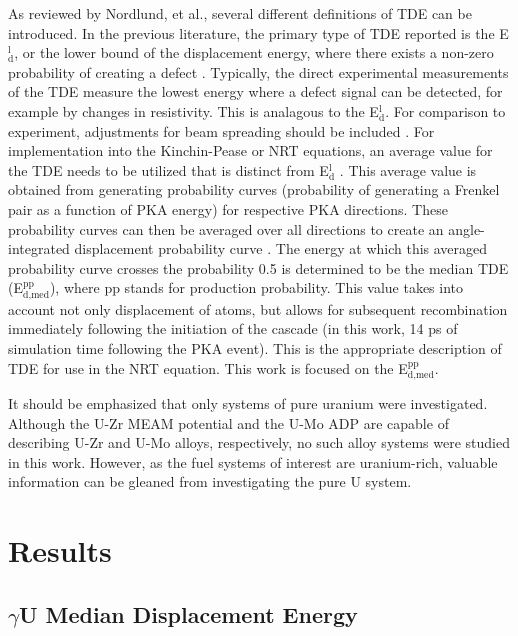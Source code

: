 \documentclass[review]{elsarticle}
\begin{document}
As reviewed by Nordlund, et al.\cite{nordlund2006}, several different definitions of TDE can be introduced. In the previous literature, the primary type of TDE reported is the E$^{\textrm{l}}_{\textrm{d}}$, or the lower bound of the displacement energy, where there exists a non-zero probability of creating a defect \cite{malerba2002}. Typically, the direct experimental measurements of the TDE measure the lowest energy where a defect signal can be detected, for example by changes in resistivity. This is analagous to the E$^{\textrm{l}}_{\textrm{d}}$. For comparison to experiment, adjustments for beam spreading should be included \cite{nordlund2006}. For implementation into the Kinchin-Pease or NRT equations, an average value for the TDE needs to be utilized that is distinct from E$^{\textrm{l}}_{\textrm{d}}$ \cite{nordlund2006,norgett1975}. This average value is obtained from generating probability curves (probability of generating a Frenkel pair as a function of PKA energy) for respective PKA directions. These probability curves can then be averaged over all directions to create an angle-integrated displacement probability curve \cite{nordlund2006}. The energy at which this averaged probability curve crosses the probability 0.5 is determined to be the median TDE (E$^{\textrm{pp}}_{\textrm{d,med}}$), where pp stands for production probability. This value takes into account not only displacement of atoms, but allows for subsequent recombination immediately following the initiation of the cascade (in this work, 14 ps of simulation time following the PKA event). This is the appropriate description of TDE for use in the NRT equation. This work is focused on the E$^{\textrm{pp}}_{\textrm{d,med}}$.

It should be emphasized that only systems of pure uranium were investigated. Although the U-Zr MEAM potential and the U-Mo ADP are capable of describing U-Zr and U-Mo alloys, respectively, no such alloy systems were studied in this work. However, as the fuel systems of interest are uranium-rich, valuable information can be gleaned from investigating the pure U system.

\section{Results}
\subsection{$\gamma$U Median Displacement Energy}
\end{document}
